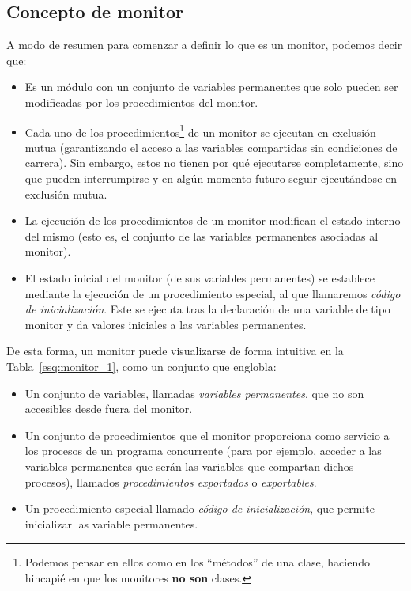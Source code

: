 \subsection{Concepto de monitor}\label{sec:concepto_de_monitor}
A modo de resumen para comenzar a definir lo que es un monitor, podemos decir que:
\begin{itemize}
    \item Es un módulo con un conjunto de variables permanentes que solo pueden ser modificadas por los procedimientos del monitor.
    \item Cada uno de los procedimientos\footnote{Podemos pensar en ellos como en los ``métodos'' de una clase, haciendo hincapié en que los monitores \textbf{no son} clases.} de un monitor se ejecutan en exclusión mutua (garantizando el acceso a las variables compartidas sin condiciones de carrera). Sin embargo, estos no tienen por qué ejecutarse completamente, sino que pueden interrumpirse y en algún momento futuro seguir ejecutándose en exclusión mutua.
    \item La ejecución de los procedimientos de un monitor modifican el estado interno del mismo (esto es, el conjunto de las variables permanentes asociadas al monitor).
    \item El estado inicial del monitor (de sus variables permanentes) se establece mediante la ejecución de un procedimiento especial, al que llamaremos \textit{código de inicialización}. Este se ejecuta tras la declaración de una variable de tipo monitor y da valores iniciales a las variables permanentes.
\end{itemize}
De esta forma, un monitor puede visualizarse de forma intuitiva en la Tabla~\ref{esq:monitor_1}, como un conjunto que englobla:
\begin{itemize}
    \item Un conjunto de variables, llamadas \textit{variables permanentes}, que no son accesibles desde fuera del monitor.
    \item Un conjunto de procedimientos que el monitor proporciona como servicio a los procesos de un programa concurrente (para por ejemplo, acceder a las variables permanentes que serán las variables que compartan dichos procesos), llamados \textit{procedimientos exportados} o \textit{exportables}.
    \item Un procedimiento especial llamado \textit{código de inicialización}, que permite inicializar las variable permanentes.
\end{itemize}

